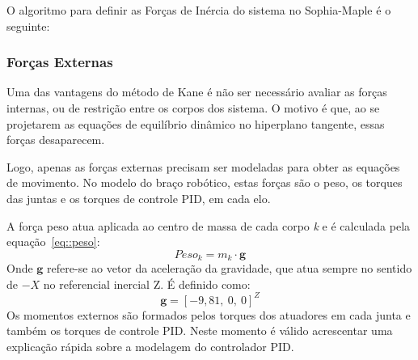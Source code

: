 O algoritmo para definir as Forças de Inércia do sistema no Sophia-Maple é o
seguinte:

\medskip {}

\medskip {}

\medskip {}

\medskip {}


\subsubsection{Forças Externas}

Uma das vantagens do método de Kane é não ser necessário avaliar as forças
internas, ou de restrição entre os corpos dos sistema. O motivo é que, ao se
projetarem as equações de equilíbrio dinâmico no hiperplano tangente, essas
forças desaparecem.

Logo, apenas as forças externas precisam ser modeladas para obter as equações de
movimento. No modelo do braço robótico, estas forças são o peso, os torques das
juntas e os torques de controle PID, em cada elo.

A força peso atua aplicada ao centro de massa de cada corpo \textit{k} e é calculada
pela equação~\ref{eq::peso}:
%
\begin{equation}
	Peso_{k} = m_{k} \cdot \mathbf{g} \label{eq::peso}
\end{equation}
%
Onde $\mathbf{g}$ refere-se ao vetor da aceleração da gravidade, que atua sempre
no sentido de $-X$ no referencial inercial Z. É definido como:
%
\begin{equation}
	\mathbf{g} = [-9,81,~0,~0]^{Z}
\end{equation}
%
Os momentos externos são formados pelos torques dos atuadores em cada junta e
também os torques de controle PID. Neste momento é válido acrescentar uma
explicação rápida sobre a modelagem do controlador PID.

